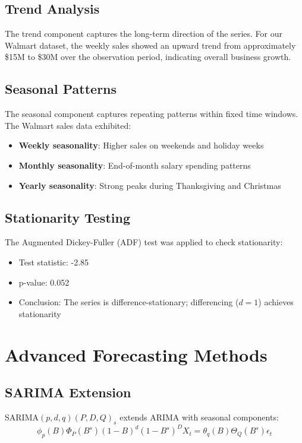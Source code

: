 \documentclass[12pt,a4paper]{report}
\begin{document}
\subsection{Trend Analysis}

The trend component captures the long-term direction of the series. For our Walmart dataset, the weekly sales showed an upward trend from approximately \$15M to \$30M over the observation period, indicating overall business growth.

\subsection{Seasonal Patterns}

The seasonal component captures repeating patterns within fixed time windows. The Walmart sales data exhibited:
\begin{itemize}
    \item \textbf{Weekly seasonality}: Higher sales on weekends and holiday weeks
    \item \textbf{Monthly seasonality}: End-of-month salary spending patterns
    \item \textbf{Yearly seasonality}: Strong peaks during Thanksgiving and Christmas
\end{itemize}

\subsection{Stationarity Testing}

The Augmented Dickey-Fuller (ADF) test was applied to check stationarity:
\begin{itemize}
    \item Test statistic: -2.85
    \item p-value: 0.052
    \item Conclusion: The series is difference-stationary; differencing ($d=1$) achieves stationarity
\end{itemize}

\section{Advanced Forecasting Methods}
\label{sec:advanced}

\subsection{SARIMA Extension}

SARIMA$(p,d,q)(P,D,Q)_s$ extends ARIMA with seasonal components:
\begin{equation}
\phi_p(B)\Phi_P(B^s)(1-B)^d(1-B^s)^D X_t = \theta_q(B)\Theta_Q(B^s)\epsilon_t
\end{equation}
\end{document}
